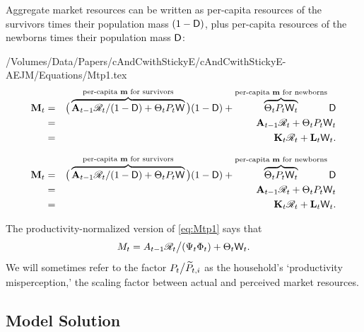 \documentclass[titlepage]{./econtex}
\begin{document}
Aggregate market resources can be written as per-capita resources of the survivors times their population mass $(1-\mathsf{D})$, plus per-capita resources of the newborns times their population mass $\mathsf{D}$: 
\begin{verbatimwrite}{/Volumes/Data/Papers/cAndCwithStickyE/cAndCwithStickyE-AEJM/Equations/Mtp1.tex}
\begin{eqnarray}
  \mathbf{M}_{t} & = & \big(\overbrace{\mathbf{A}_{t-1} {\mathscr{R}}_t/(1-\mathsf{D})  + \Theta_{t} {P}_{t}\mathsf{W}}^{\text{per-capita $\mathbf{m}$ for survivors}}\big)(1-\mathsf{D})+\overbrace{\Theta_{t} {P}_{t}\mathsf{W}_t}^{\text{per-capita $\mathbf{m}$ for newborns}} \mathsf{D} \nonumber \\
                       & = & \mathbf{A}_{t-1} {\mathscr{R}}_t + \Theta_{t} P_t \mathsf{W}_t  \label{eq:Mtp1} \\
                       & = & \mathbf{K}_t \mathscr{R}_t + \mathbf{L}_t \mathsf{W}_t. \nonumber
\end{eqnarray}
\end{verbatimwrite}
\begin{eqnarray}
  \mathbf{M}_{t} & = & \big(\overbrace{\mathbf{A}_{t-1} {\mathscr{R}}_t/(1-\mathsf{D})  + \Theta_{t} {P}_{t}\mathsf{W}}^{\text{per-capita $\mathbf{m}$ for survivors}}\big)(1-\mathsf{D})+\overbrace{\Theta_{t} {P}_{t}\mathsf{W}_t}^{\text{per-capita $\mathbf{m}$ for newborns}} \mathsf{D} \nonumber \\
                       & = & \mathbf{A}_{t-1} {\mathscr{R}}_t + \Theta_{t} P_t \mathsf{W}_t  \label{eq:Mtp1} \\
                       & = & \mathbf{K}_t \mathscr{R}_t + \mathbf{L}_t \mathsf{W}_t. \nonumber
\end{eqnarray}
 

The productivity-normalized version of \eqref{eq:Mtp1} says that
\begin{equation}\label{eq:Mtp1norm}
M_t = A_{t-1} \mathscr{R}_t\big/(\Psi_t \Phi_t) + \Theta_t \mathsf{W}_t.
\end{equation}
We will sometimes refer to the factor $P_t\big/\widetilde{P}_{t,i}$ as the household's `productivity misperception,' the scaling factor between actual and perceived market resources.


\subsection{Model Solution}
\end{document}
